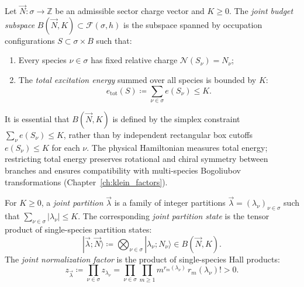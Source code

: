\begin{definition}
\label{def:joint_budget}
Let $\vec{N} : \sigma \to \mathbb{Z}$ be an admissible sector charge vector and $K \ge 0$.
The \emph{joint budget subspace} $B(\vec{N}, K) \subset \mathcal{F}(\sigma, h)$ is the subspace spanned by occupation configurations $S \subset \sigma \times B$ such that:
\begin{enumerate}
    \item Every species $\nu \in \sigma$ has fixed relative charge $\mathcal{N}(S_\nu) = N_\nu$;
    \item The \emph{total excitation energy} summed over all species is bounded by $K$:
    \begin{equation}
    e_{\mathrm{tot}}(S) \coloneqq \sum_{\nu \in \sigma} e(S_\nu) \le K.
    \end{equation}
\end{enumerate}
\end{definition}

\begin{remark}
It is essential that $B(\vec{N}, K)$ is defined by the simplex constraint $\sum_\nu e(S_\nu) \le K$, rather than by independent rectangular box cutoffs $e(S_\nu) \le K$ for each $\nu$. The physical Hamiltonian measures total energy; restricting total energy preserves rotational and chiral symmetry between branches and ensures compatibility with multi-species Bogoliubov transformations (Chapter~\ref{ch:klein_factors}).
\end{remark}

\begin{definition}
\label{def:joint_partitions}
For $K \ge 0$, a \emph{joint partition} $\vec{\lambda}$ is a family of integer partitions $\vec{\lambda} = (\lambda_\nu)_{\nu \in \sigma}$ such that $\sum_{\nu \in \sigma} |\lambda_\nu| \le K$.
The corresponding \emph{joint partition state} is the tensor product of single-species partition states:
\begin{equation}
|\vec{\lambda}; \vec{N}\rangle \coloneqq \bigotimes_{\nu \in \sigma} |\lambda_\nu; N_\nu\rangle \in B(\vec{N}, K).
\end{equation}
The \emph{joint normalization factor} is the product of single-species Hall products:
\begin{equation}
z_{\vec{\lambda}} \coloneqq \prod_{\nu \in \sigma} z_{\lambda_\nu} = \prod_{\nu \in \sigma} \prod_{m \ge 1} m^{r_m(\lambda_\nu)}\, r_m(\lambda_\nu)! > 0.
\end{equation}
\end{definition}

